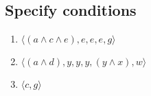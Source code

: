 \subsection{Specify conditions}


\begin{enumerate}
    \item $\langle (a \wedge c \wedge e), e, e, e, g \rangle $
    \item $\langle (a \wedge d), y, y, y, (y \wedge x), w  \rangle $
    \item $\langle c, g \rangle $
\end{enumerate}